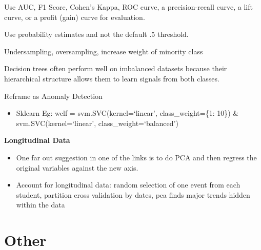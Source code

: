 \documentclass[]{book}
\providecommand{\tightlist}{%
  \setlength{\itemsep}{0pt}\setlength{\parskip}{0pt}}
\theoremstyle{definition}
\theoremstyle{definition}
\theoremstyle{definition}
\theoremstyle{remark}
\begin{document}
Use AUC, F1 Score, Cohen's Kappa, ROC curve, a precision-recall curve, a
lift curve, or a profit (gain) curve for evaluation.

Use probability estimates and not the default .5 threshold.

Undersampling, oversampling, increase weight of minority class

Decision trees often perform well on imbalanced datasets because their
hierarchical structure allows them to learn signals from both classes.

Reframe as Anomaly Detection

\begin{itemize}
\tightlist
\item
  Sklearn Eg: wclf = svm.SVC(kernel=`linear', class\_weight=\{1: 10\})
  \& svm.SVC(kernel=`linear', class\_weight=`balanced')
\end{itemize}

\textbf{Longitudinal Data}

\begin{itemize}
\item
  One far out suggestion in one of the links is to do PCA and then
  regress the original variables against the new axis.
\item
  Account for longitudinal data: random selection of one event from each
  student, partition cross validation by dates, pca finds major trends
  hidden within the data
\end{itemize}

\section{Other}\label{other}
\end{document}
